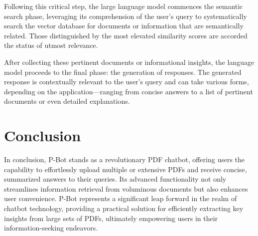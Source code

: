 \documentclass[conference]{IEEEtran}
\begin{document}
Following this critical step, the large language model commences the semantic search phase, leveraging its comprehension of the user's query to systematically search the vector database for documents or information that are semantically related. Those distinguished by the most elevated similarity scores are accorded the status of utmost relevance.

After collecting these pertinent documents or informational insights, the language model proceeds to the final phase: the generation of responses. The generated response is contextually relevant to the user's query and can take various forms, depending on the application—ranging from concise answers to a list of pertinent documents or even detailed explanations.



\section{Conclusion}
In conclusion, P-Bot stands as a revolutionary PDF chatbot, offering users the capability to effortlessly upload multiple or extensive PDFs and receive concise, summarized answers to their queries. Its advanced functionality not only streamlines information retrieval from voluminous documents but also enhances user convenience. P-Bot represents a significant leap forward in the realm of chatbot technology, providing a practical solution for efficiently extracting key insights from large sets of PDFs, ultimately empowering users in their information-seeking endeavors.





\end{document}
